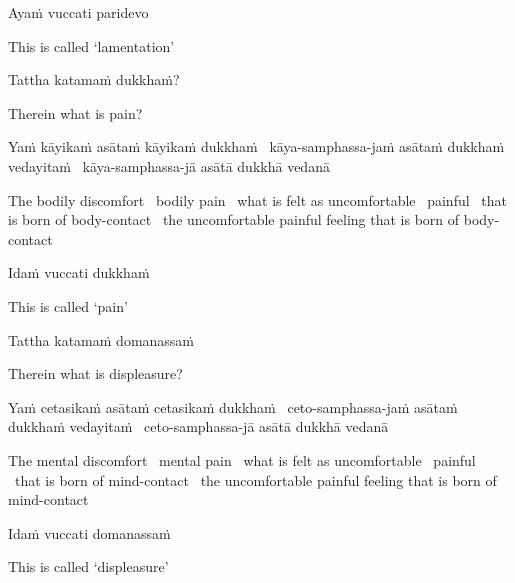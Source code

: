 Ayaṁ vuccati paridevo

\begin{english}
  This is called `lamentation'
\end{english}

Tattha katamaṁ dukkhaṁ?

\begin{english}
  Therein what is pain?
\end{english}

\begin{pali-hang}
  Yaṁ kāyikaṁ asātaṁ kāyikaṁ dukkhaṁ \breathmark\ kāya-samphassa-jaṁ asātaṁ dukkhaṁ vedayitaṁ \breathmark\ kāya-samphassa-jā asātā dukkhā vedanā
\end{pali-hang}

\begin{english-hang-verses}
  The bodily discomfort \breathmark\ bodily pain \breathmark\ what is felt as uncomfortable \breathmark\ painful \breathmark\ that is born of body-contact \breathmark\ the uncomfortable painful feeling that is born of body-contact
\end{english-hang-verses}

Idaṁ vuccati dukkhaṁ

\begin{english}
  This is called `pain'
\end{english}

Tattha katamaṁ domanassaṁ

\begin{english}
  Therein what is displeasure?
\end{english}

\begin{pali-hang}
  Yaṁ cetasikaṁ asātaṁ cetasikaṁ dukkhaṁ \breathmark\ ceto-samphassa-jaṁ asātaṁ dukkhaṁ vedayitaṁ \breathmark\ ceto-samphassa-jā asātā dukkhā vedanā
\end{pali-hang}

\begin{english-hang-verses}
  The mental discomfort \breathmark\ mental pain \breathmark\ what is felt as uncomfortable \breathmark\ painful \breathmark\ that is born of mind-contact \breathmark\ the uncomfortable painful feeling that is born of mind-contact
\end{english-hang-verses}

Idaṁ vuccati domanassaṁ

\begin{english}
  This is called `displeasure'
\end{english}

